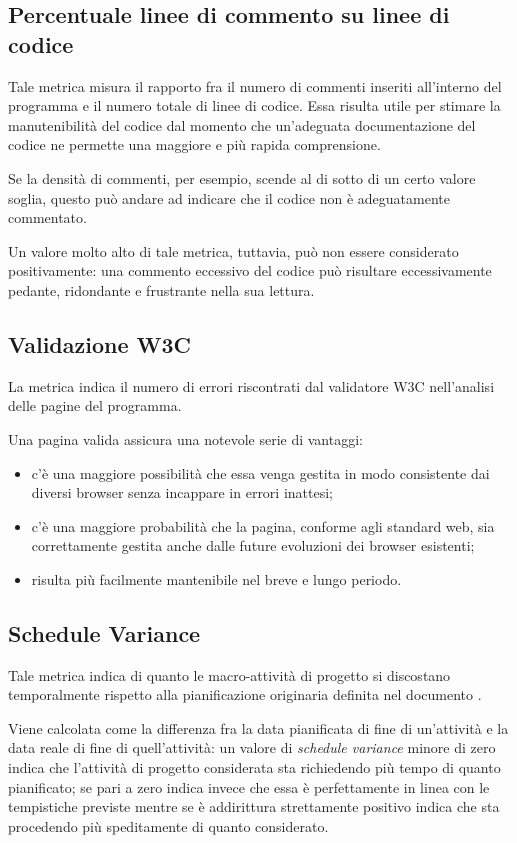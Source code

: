 \subsection{Percentuale linee di commento su linee di codice}
Tale metrica misura il rapporto fra il numero di commenti inseriti all'interno del programma e il numero totale di linee di codice. Essa risulta utile per stimare la manutenibilità del codice dal momento che un'adeguata documentazione del codice ne permette una maggiore e più rapida comprensione.

Se la densità di commenti, per esempio, scende al di sotto di un certo valore soglia, questo può andare ad indicare che il codice non è adeguatamente commentato.

Un valore molto alto di tale metrica, tuttavia, può non essere considerato positivamente: una commento eccessivo del codice può risultare eccessivamente pedante, ridondante e frustrante nella sua lettura.



\subsection{Validazione W3C}
La metrica indica il numero di errori riscontrati dal validatore W3C nell'analisi delle pagine  del programma.

Una pagina valida assicura una notevole serie di vantaggi:
\begin{itemize}
 	\item c'è una maggiore possibilità che essa venga gestita in modo consistente dai diversi browser senza incappare in errori inattesi;
 	\item c'è una maggiore probabilità che la pagina, conforme agli standard web, sia correttamente gestita anche dalle future evoluzioni dei browser esistenti;
 	\item risulta più facilmente mantenibile nel breve e lungo periodo.
\end{itemize}



\subsection{Schedule Variance}
Tale metrica indica di quanto le macro-attività di progetto si discostano temporalmente rispetto alla pianificazione originaria definita nel documento \PdP . 

Viene calcolata come la differenza fra la data pianificata di fine di un'attività e la data reale di fine di quell'attività: un valore di \emph{schedule variance} minore di zero indica che l'attività di progetto considerata sta richiedendo più tempo di quanto pianificato; se pari a zero indica invece che essa è perfettamente in linea con le tempistiche previste mentre se è addirittura strettamente positivo indica che sta procedendo più speditamente di quanto considerato. 

